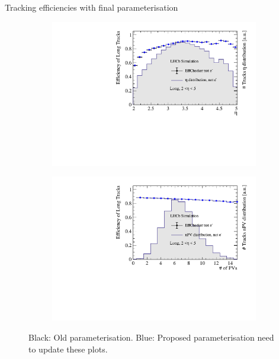 \documentclass[xcolor={dvipsnames}]{beamer}
\begin{document}
\begin{frame}{Tracking efficiencies with final parameterisation}
\begin{figure}[htb]
\begin{subfigure}{0.45\textwidth}
      \includegraphics[width=1\textwidth]{Plots/TrackEfficiency_eta_improved_MC_parameterisation.pdf}
    \end{subfigure}%
    \begin{subfigure}{0.45\textwidth}
      \includegraphics[width=1\textwidth]{Plots/TrackEfficiency_nPV_improved_MC_parameterisation.pdf}
    \end{subfigure}
    \vspace{-0.2cm}
    \caption*{Black: Old parameterisation. {\color{blue}Blue: Proposed parameterisation} {\color{red}need to update these plots}.}
  \end{figure}
\end{frame}
\end{document}

